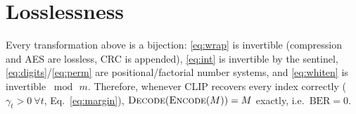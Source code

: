 \documentclass[11pt]{article}
\begin{document}
\section{Losslessness}
Every transformation above is a bijection: \eqref{eq:wrap} is invertible
(compression and AES are lossless, CRC is appended), \eqref{eq:int} is invertible
by the sentinel, \eqref{eq:digits}/\eqref{eq:perm} are positional/factorial number
systems, and \eqref{eq:whiten} is invertible $\bmod\,m$. Therefore, whenever CLIP
recovers every index correctly ($\gamma_t>0\ \forall t$, Eq.~\eqref{eq:margin}),
$\textsc{Decode}(\textsc{Encode}(M))=M$ exactly, i.e.\ $\mathrm{BER}=0$.
\end{document}
